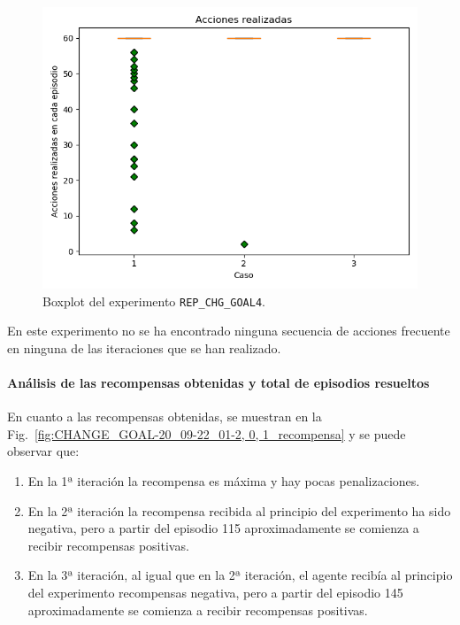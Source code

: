 \begin{figure}
    \centering
    \includegraphics[scale=0.4]{cap5_experimentacion/images/CHANGE_GOAL-20_09-22_01-2, 0, 1_boxplot.png}
    \caption{Boxplot del experimento \texttt{REP\_CHG\_GOAL4}.}
    \label{fig:CHANGE_GOAL-20_09-22_01-2, 0, 1_boxplot}
\end{figure}

En este experimento no se ha encontrado ninguna secuencia de acciones frecuente en ninguna de las iteraciones que se han realizado. 

\paragraph{Análisis de las recompensas obtenidas y total de episodios resueltos} 

En cuanto a las recompensas obtenidas, se muestran en la Fig.~\ref{fig:CHANGE_GOAL-20_09-22_01-2, 0, 1_recompensa} y se puede observar que: 
\begin{enumerate}
    \item En la 1ª iteración la recompensa es máxima y hay pocas penalizaciones. 
    \item En la 2ª iteración la recompensa recibida al principio del experimento ha sido negativa, pero a partir del episodio 115 aproximadamente se comienza a recibir recompensas positivas. 
    \item En la 3ª iteración, al igual que en la 2ª iteración, el agente recibía al principio del experimento recompensas negativa, pero a partir del episodio 145 aproximadamente se comienza a recibir recompensas positivas. 
\end{enumerate}
 
